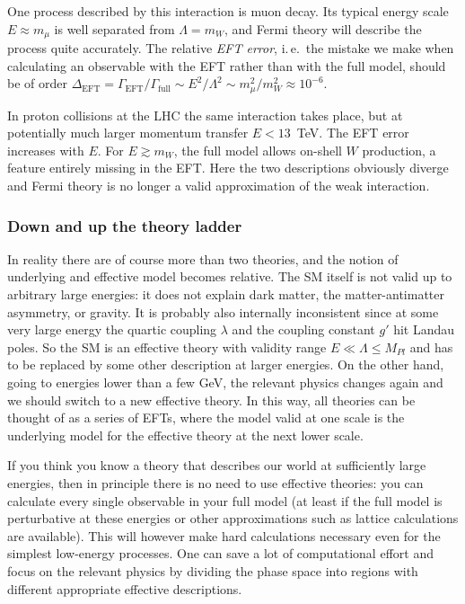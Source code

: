 One process described by this interaction is muon decay. Its typical
energy scale $E \approx m_\mu$ is well separated from $\Lambda = m_W$,
and Fermi theory will describe the process quite accurately. The
relative \emph{EFT error}, i.\,e.\ the mistake we make when
calculating an observable with the EFT rather than with the full
model, should be of order $\Delta_\text{EFT} = \Gamma_\text{EFT} / \Gamma_\text{full}  \sim E^2 / \Lambda^2 \sim m_\mu^2 / m_W^2 \approx 10^{-6}$.

In proton collisions at the LHC the same interaction takes place, but
at potentially much larger momentum transfer $E < 13$~TeV. The EFT
error increases with $E$. For $E \gtrsim m_W$, the full model allows
on-shell $W$ production, a feature entirely missing in the EFT. Here
the two descriptions obviously diverge and Fermi theory is no longer a
valid approximation of the weak interaction.



\subsubsection{Down and up the theory ladder}

In reality there are of course more than two theories, and the notion
of underlying and effective model becomes relative. The SM itself is
not valid up to arbitrary large energies: it does not explain dark
matter, the matter-antimatter asymmetry, or gravity. It is probably
also internally inconsistent since at some very large energy the
quartic coupling $\lambda$ and the coupling constant $g'$ hit Landau
poles. So the SM is an effective theory with validity range
$E \ll \Lambda \le M_{Pl}$ and has to be replaced by some other
description at larger energies. On the other hand, going to energies
lower than a few GeV, the relevant physics changes again and we should
switch to a new effective theory. In this way, all theories can be
thought of as a series of EFTs, where the model valid at one scale is
the underlying model for the effective theory at the next lower scale.

If you think you know a theory that describes our world at
sufficiently large energies, then in principle there is no need to use
effective theories: you can calculate every single observable in your
full model (at least if the full model is perturbative at these
energies or other approximations such as lattice calculations are
available). This will however make hard calculations necessary even
for the simplest low-energy processes. One can save a lot of
computational effort and focus on the relevant physics by dividing the
phase space into regions with different appropriate effective
descriptions.

